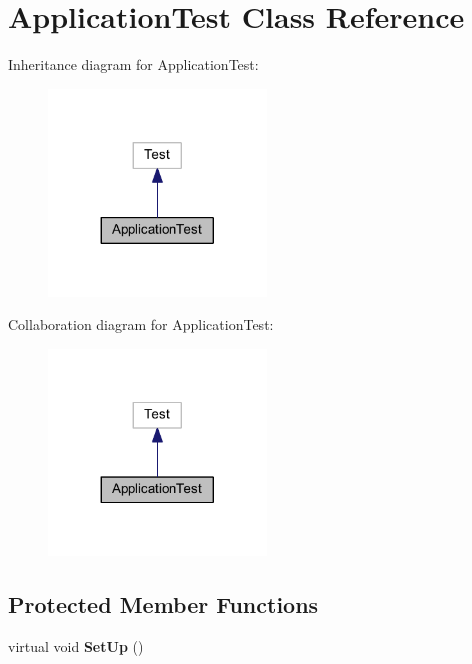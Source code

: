 \hypertarget{class_application_test}{}\section{Application\+Test Class Reference}
\label{class_application_test}


Inheritance diagram for Application\+Test\+:
\nopagebreak
\begin{figure}[H]
\begin{center}
\leavevmode
\includegraphics[width=164pt]{class_application_test__inherit__graph}
\end{center}
\end{figure}


Collaboration diagram for Application\+Test\+:
\nopagebreak
\begin{figure}[H]
\begin{center}
\leavevmode
\includegraphics[width=164pt]{class_application_test__coll__graph}
\end{center}
\end{figure}
\subsection*{Protected Member Functions}
\begin{DoxyCompactItemize}
\item 
\hypertarget{class_application_test_a0ed0ce167bcb37c85c5c0bec236296d2}{}\label{class_application_test_a0ed0ce167bcb37c85c5c0bec236296d2} 
virtual void {\bfseries Set\+Up} ()
\end{DoxyCompactItemize}

